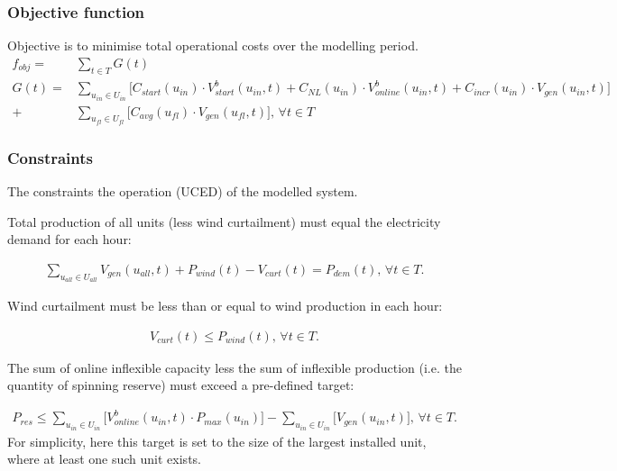 \documentclass{article}
\begin{document}
\newpage

\subsubsection*{Objective function}
Objective is to minimise total operational costs over the modelling period.
%
\begin{align*}
    f_{obj} = & \sum_{t \in T} G(t) \\
    G(t) = & \sum_{u_{in} \in  U_{in}} 
             \Big[ 
             C_{start}(u_{in}) \cdot V_{start}^b(u_{in}, t) + C_{NL}(u_{in}) \cdot V_{online}^b(u_{in}, t) + C_{incr}(u_{in}) \cdot V_{gen}(u_{in}, t)  \Big] \nonumber \\
             + & \sum_{u_{fl} \in  U_{fl}}
             \Big[ 
             C_{avg}(u_{fl}) \cdot V_{gen}(u_{fl}, t) 
             \Big] \text{, } \forall t \in T
\end{align*}
%
\subsubsection*{Constraints}
The constraints the operation (UCED) of the modelled system.

Total production of all units (less wind curtailment) must equal the electricity demand for each hour:

\begin{align*}
    \sum_{u_{all} \in U_{all}} V_{gen}(u_{all},t) + P_{wind}(t) - V_{curt}(t) = P_{dem}(t) \text{, } \forall t \in T.
\end{align*}

Wind curtailment must be less than or equal to wind production in each hour:

\begin{align*}
    V_{curt}(t) \leq P_{wind}(t) \text{, } \forall t \in T.
\end{align*}

The sum of online inflexible capacity less the sum of inflexible production (i.e. the quantity of spinning reserve) must exceed a pre-defined target:

\begin{align*}
    P_{res} \leq \sum_{u_{in} \in U_{in}} \Big[ V_{online}^b(u_{in},t) \cdot P_{max}(u_{in}) \Big] - \sum_{u_{in} \in U_{in}} \Big[ V_{gen}(u_{in},t) \Big] \text{, } \forall t \in T.
\end{align*}
For simplicity, here this target is set to the size of the largest installed unit, where at least one such unit exists.
\end{document}
